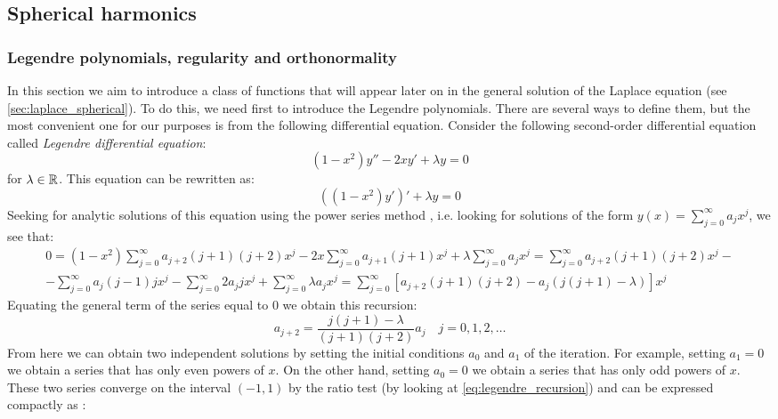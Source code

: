 \documentclass[../main.tex]{subfiles}
\begin{document}
\subsection{Spherical harmonics}
\subsubsection{Legendre polynomials, regularity and orthonormality}
In this section we aim to introduce a class of functions that will appear later on in the general solution of the Laplace equation (see \cref{sec:laplace_spherical}). To do this, we need first to introduce the Legendre polynomials. There are several ways to define them, but the most convenient one for our purposes is from the following differential equation. Consider the following second-order differential equation called \emph{Legendre differential equation}:
\begin{equation}
  (1-x^2)y''-2xy'+\lambda y=0
\end{equation}
for $\lambda\in\mathbb{R}$. This equation can be rewritten as:
\begin{equation}\label{eq:legendre_diff_eq}
  {((1-x^2)y')}'+\lambda  y=0
\end{equation}
Seeking for analytic solutions of this equation using the power series method \cite{florida:legendre}, i.e. looking for solutions of the form $y(x)=\sum_{j=0}^{\infty}a_jx^j$, we see that:
\begin{multline}
  0=(1-x^2)\sum_{j=0}^{\infty}a_{j+2}(j+1)(j+2)x^j-2x\sum_{j=0}^{\infty}a_{j+1}(j+1)x^j+\lambda\sum_{j=0}^{\infty}a_jx^j =\sum_{j=0}^{\infty}a_{j+2}(j+1)(j+2)x^j-\\-\sum_{j=0}^{\infty}a_{j}(j-1)jx^{j}-\sum_{j=0}^{\infty}2a_{j}jx^{j}+\sum_{j=0}^{\infty}\lambda a_jx^j  =\sum_{j=0}^{\infty}[a_{j+2}(j+1)(j+2) - a_j(j(j+1)-\lambda)]x^j
\end{multline}
Equating the general term of the series equal to 0 we obtain this recursion:
\begin{equation}\label{eq:legendre_recursion}
  a_{j+2}=\frac{j(j+1)-\lambda}{(j+1)(j+2)}a_j\quad j=0,1,2,\ldots
\end{equation}
From here we can obtain two independent solutions by setting the initial conditions $a_0$ and $a_1$ of the iteration. For example, setting $a_1=0$ we obtain a series that has only even powers of $x$. On the other hand, setting $a_0=0$ we obtain a series that has only odd powers of $x$. These two series converge on the interval $(-1,1)$ by the ratio test (by looking at \cref{eq:legendre_recursion}) and can be expressed compactly as \cite{florida:legendre}:
\end{document}

